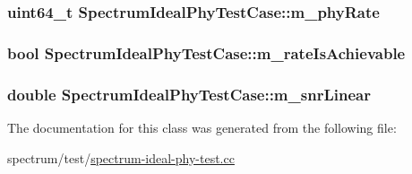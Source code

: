 \subsubsection[{\texorpdfstring{m\+\_\+phy\+Rate}{m_phyRate}}]{\setlength{\rightskip}{0pt plus 5cm}uint64\+\_\+t Spectrum\+Ideal\+Phy\+Test\+Case\+::m\+\_\+phy\+Rate\hspace{0.3cm}{\ttfamily [private]}}\hypertarget{classSpectrumIdealPhyTestCase_a9cfb76527300fd830e2b43ad70c580d6}{}\label{classSpectrumIdealPhyTestCase_a9cfb76527300fd830e2b43ad70c580d6}
\subsubsection[{\texorpdfstring{m\+\_\+rate\+Is\+Achievable}{m_rateIsAchievable}}]{\setlength{\rightskip}{0pt plus 5cm}bool Spectrum\+Ideal\+Phy\+Test\+Case\+::m\+\_\+rate\+Is\+Achievable\hspace{0.3cm}{\ttfamily [private]}}\hypertarget{classSpectrumIdealPhyTestCase_a613895127f75c079ee1fdaccbe62b547}{}\label{classSpectrumIdealPhyTestCase_a613895127f75c079ee1fdaccbe62b547}
\subsubsection[{\texorpdfstring{m\+\_\+snr\+Linear}{m_snrLinear}}]{\setlength{\rightskip}{0pt plus 5cm}double Spectrum\+Ideal\+Phy\+Test\+Case\+::m\+\_\+snr\+Linear\hspace{0.3cm}{\ttfamily [private]}}\hypertarget{classSpectrumIdealPhyTestCase_a3934f63bf1d4b1924f88f40b7986fb9c}{}\label{classSpectrumIdealPhyTestCase_a3934f63bf1d4b1924f88f40b7986fb9c}


The documentation for this class was generated from the following file\+:\begin{DoxyCompactItemize}
\item 
spectrum/test/\hyperlink{spectrum-ideal-phy-test_8cc}{spectrum-\/ideal-\/phy-\/test.\+cc}\end{DoxyCompactItemize}
